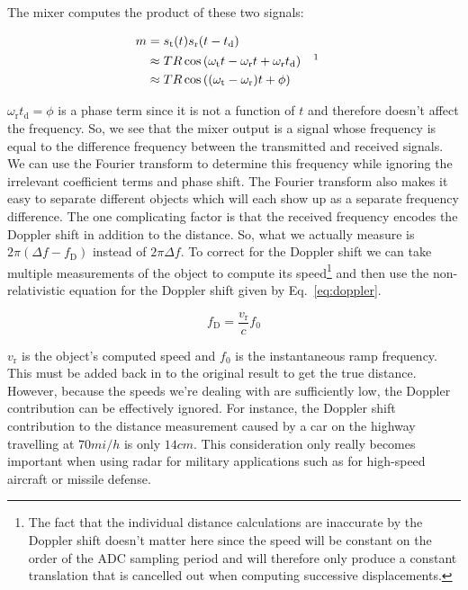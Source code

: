 \documentclass{default}
\begin{document}
The mixer computes the product of these two signals:

\begin{align}
  m &= s_{\text{t}}(t) s_{\text{r}}(t-t_{\text{d}}) \\
    &\approx T R \cos \left( \omega_{\text{t}}t - \omega_{\text{r}}t + \omega_{\text{r}}t_{\text{d}}
      \right) && \text{\footnotemark} \\
    &\approx T R \cos \left( (\omega_{\text{t}} - \omega_{\text{r}})t + \phi \right)
\end{align}

$\omega_{\text{r}}t_{\text{d}} = \phi$ is a phase term since it is not a function of $t$ and
therefore doesn't affect the frequency. So, we see that the mixer output is a signal whose frequency
is equal to the difference frequency between the transmitted and received signals. We can use the
Fourier transform to determine this frequency while ignoring the irrelevant coefficient terms and
phase shift. The Fourier transform also makes it easy to separate different objects which will each
show up as a separate frequency difference. The one complicating factor is that the received
frequency encodes the Doppler shift in addition to the distance. So, what we actually measure is
$2 \pi (\Delta f - f_{\text{D}})$ instead of $2 \pi \Delta f$. To correct for the Doppler shift we
can take multiple measurements of the object to compute its speed\footnote{The fact that the
  individual distance calculations are inaccurate by the Doppler shift doesn't matter here since the
  speed will be constant on the order of the ADC sampling period and will therefore only produce a
  constant translation that is cancelled out when computing successive displacements.} and then use
the non-relativistic equation for the Doppler shift given by Eq.~\ref{eq:doppler}.

\begin{equation}
        \label{eq:doppler}
        f_{\text{D}} = \frac{v_{\text{r}}}{c} f_0
\end{equation}

$v_{\text{r}}$ is the object's computed speed and $f_0$ is the instantaneous ramp frequency. This
must be added back in to the original result to get the true distance. However, because the speeds
we're dealing with are sufficiently low, the Doppler contribution can be effectively ignored. For
instance, the Doppler shift contribution to the distance measurement caused by a car on the highway
travelling at $70 \si{mi/h}$ is only $14 \si{cm}$. This consideration only really becomes important
when using radar for military applications such as for high-speed aircraft or missile defense.
\end{document}
